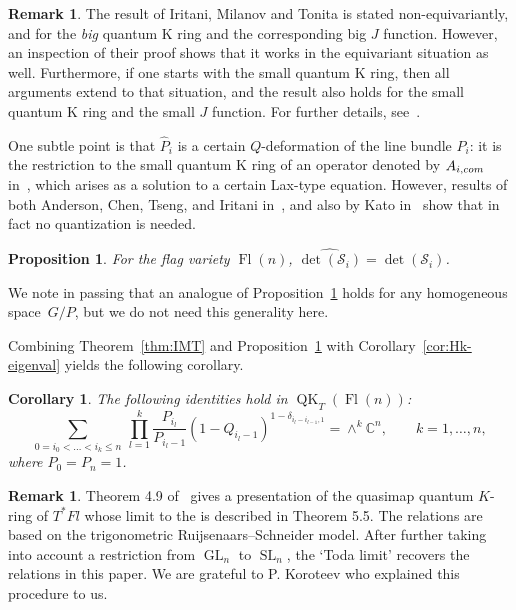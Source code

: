 \documentclass[11pt]{article}
\numberwithin{equation}{section}
\numberwithin{equation}{section}
\newtheorem{Corollary}[Theorem]{Corollary}
\newtheorem{Proposition}[Theorem]{Proposition}
\theoremstyle{definition}
\newtheorem{Remark}[Theorem]{Remark}
\DeclareMathOperator{\GL}{GL}
\DeclareMathOperator{\SL}{SL}
\DeclareMathOperator{\Fl}{Fl}
\DeclareMathOperator{\QK}{QK}
\newcommand{\C}{{\mathbb C}}
\begin{document}
\begin{Remark}
The result of Iritani, Milanov and Tonita is stated non-equivariantly, and for the
{\em big} quantum K ring and the corresponding big $J$ function. However, an inspection of their proof shows that it works in the equivariant situation as well.
Furthermore, if one starts with the small quantum K ring, then all arguments extend
to that situation, and the result also holds for the small quantum K ring and the small $J$ function. For further details, see~\cite{huq2024relations}.
\end{Remark}
One subtle point is that $\widehat{P}_i$ is a certain $Q$-deformation
of the line bundle $P_i$: it is the restriction to the small
quantum K ring
of an operator denoted by
$A_{i,{\rm com}}$ in~\cite[Corollary~2.9]{Iritani:2013qka}, which
arises as a solution to a certain Lax-type equation.
However, results of both Anderson, Chen, Tseng, and Iritani
in~\cite[Lemma~6]{anderson2022finite}, and also
by Kato in~\cite[Theorem~1.35]{kato:loop}
show that in fact no quantization is needed.

\begin{Proposition}\label{thm:ACTI-Kato} For the flag variety $\Fl(n)$,
$\widehat{\det(\mathcal{S}_i)}=\det(\mathcal{S}_i)$.
\end{Proposition}
We note in passing that an analogue of Proposition~\ref{thm:ACTI-Kato} holds for any homogeneous
space~$G/P$, but we do not need this generality here.

Combining Theorem~\ref{thm:IMT} and Proposition~\ref{thm:ACTI-Kato} with Corollary~\ref{cor:Hk-eigenval}
yields the following corollary.
\begin{Corollary}%
The following identities hold
in $\QK_T(\Fl(n))$:
\begin{equation*}
 \sum_{0= i_0<\dots<i_k\leq n}\ \prod_{l=1}^{k}\frac{P_{i_l}}{P_{i_{l}-1}}(1-Q_{i_l-1})^{1-\delta_{i_l-i_{l-1},1}}=\wedge^k \C^n,\qquad k=1,\dots,n,
\end{equation*}
where $P_0=P_n=1$.
\end{Corollary}

\begin{Remark}
Theorem 4.9 of~\cite{koroteev} gives a presentation of the quasimap quantum $K$-ring of $T^*Fl$ whose limit to the is described in Theorem 5.5. The relations are based on the trigonometric Ruijsenaars--Schneider model. After further taking into account a restriction from $\GL_n$ to $\SL_n$, the `Toda limit' recovers the relations in this paper. We are grateful to P. Koroteev who explained this procedure to us.
\end{Remark}
\end{document}
